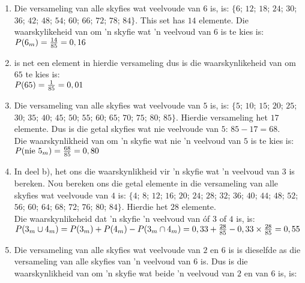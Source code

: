 \begin{solutions}{}
{\begin{enumerate}[itemsep=5pt, label=\textbf{\arabic*}. ]
\begin{enumerate}[noitemsep, label=\textbf{(\alph*)} ]
    Die waarskynlikheid van om 'n skyfie wat 'n veelvoud van $3$ is te kies is:
    $P(3_m) = \frac{28}{85}
	    = 0,33$

    \item Die versameling van alle skyfies wat veelvoude van $6$ is, is: $\{6$; $ 12$; $ 18$; $ 24$; $ 30$; $ 36$; $ 42$; $ 48$; $ 54$; $ 60$; $ 66$; $ 72$; $ 78$; $ 84\}$. This set has $14$ elemente.
   Die waarskylikeheid van om 'n skyfie wat 'n veelvoud van $6$ is te kies is:\\
    $P(6_m) = \frac{14}{85}\\
	    = 0,16$

    \item 
    \Daar is net een element in hierdie versameling dus is die waarskynlikeheid van om $65$ te kies is:\\
    $P(65) = \frac{1}{85}\\
	   = 0,01$

    \item Die versameling van alle skyfies wat veelvoude van $5$ is, is: $\{5$; $ 10$; $ 15$; $ 20$; $ 25$; $ 30$; $ 35$; $ 40$; $ 45$; $ 50$; $ 55$; $ 60$; $ 65$; $ 70$; $ 75$; $ 80$; $ 85\}$. Hierdie versameling het $17$ elemente. Dus is die getal skyfies wat nie veelvoude van $5$: $85 − 17 = 68$.\\
   
    Die waarskynlikheid van om 'n skyfie wat nie 'n veelvoud van $5$ is te kies is:\\
    $P(\mbox{nie }5_m) = \frac{68}{85}\\
	       = 0,80$

    \item In deel b), het ons die waarskynlikheid vir 'n skyfie wat 'n veelvoud van $3$ is bereken. Nou bereken ons die getal elemente in die versameling van alle skyfies wat veelvoude van $4$ is: $\{4$; $ 8$; $ 12$; $ 16$; $ 20$; $ 24$; $ 28$; $ 32$; $ 36$; $ 40$; $ 44$; $ 48$; $ 52$; $ 56$; $ 60$; $ 64$; $ 68$; $ 72$; $ 76$; $ 80$; $ 84\}$. Hierdie het $28$ elemente.\\
    
    Die waarskynlikeheid dat 'n skyfie 'n veelvoud van óf $3$ of $4$ is, is:\\
    $P(3_m \cup 4_m) = P(3_m) + P(4_m) - P(3_m \cap 4_m)\\
    = 0,33 + \frac{28}{85} - 0,33 \times \frac{28}{85}\\
    = 0,55$
    
    \item Die versameling van alle skyfies wat veelvoude van $2$ en $6$ is is dieselfde as die versameling van alle skyfies van 'n veelvoud van $6$ is. Dus is die waarskynlikheid van om 'n skyfie wat beide 'n veelvoud van $2$ en van $6$ is, is:
 

\end{enumerate}
\end{enumerate}}
\end{solutions}
